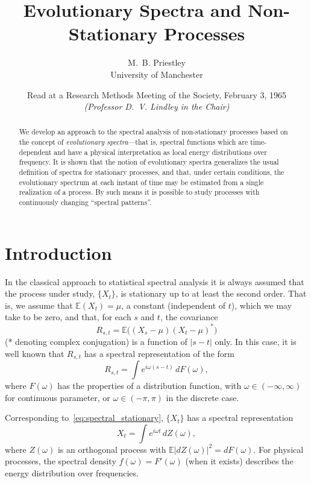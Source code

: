 \documentclass[12pt]{article}
\title{Evolutionary Spectra and Non-Stationary Processes}
\author{M.~B. Priestley \\ University of Manchester}
\date{Read at a Research Methods Meeting of the Society, February 3, 1965\\
\emph{(Professor D.~V. Lindley in the Chair)}}
\theoremstyle{definition}
\theoremstyle{plain}
\theoremstyle{remark}
\begin{document}
\maketitle

\begin{abstract}
We develop an approach to the spectral analysis of non-stationary processes based on the concept of \emph{evolutionary spectra}---that is, spectral functions which are time-dependent and have a physical interpretation as local energy distributions over frequency. It is shown that the notion of evolutionary spectra generalizes the usual definition of spectra for stationary processes, and that, under certain conditions, the evolutionary spectrum at each instant of time may be estimated from a single realization of a process. By such means it is possible to study processes with continuously changing ``spectral patterns''.
\end{abstract}

\tableofcontents

\section{Introduction}

In the classical approach to statistical spectral analysis it is always assumed that the process under study, $\{X_t\}$, is stationary up to at least the second order. That is, we assume that $\mathbb{E}(X_t) = \mu$, a constant (independent of $t$), which we may take to be zero, and that, for each $s$ and $t$, the covariance
\begin{equation}
R_{s,t} = \mathbb{E}\bigl((X_s-\mu)(X_t-\mu)^*\bigr)
\label{eq:autocov_stationary}
\end{equation}
(* denoting complex conjugation) is a function of $|s-t|$ only. In this case, it is well known that $R_{s,t}$ has a spectral representation of the form
\begin{equation}
R_{s,t} = \int e^{i \omega (s-t)}\, dF(\omega),
\label{eq:spectral_stationary}
\end{equation}
where $F(\omega)$ has the properties of a distribution function, with $\omega \in (-\infty, \infty)$ for continuous parameter, or $\omega \in (-\pi, \pi)$ in the discrete case.

Corresponding to~\eqref{eq:spectral_stationary}, $\{X_t\}$ has a spectral representation
\begin{equation}
X_t = \int e^{i \omega t}\, dZ(\omega),
\label{eq:process_rep_stationary}
\end{equation}
where $Z(\omega)$ is an orthogonal process with $\mathbb{E}|dZ(\omega)|^2 = dF(\omega)$. For physical processes, the spectral density $f(\omega) = F'(\omega)$ (when it exists) describes the energy distribution over frequencies.
\end{document}
